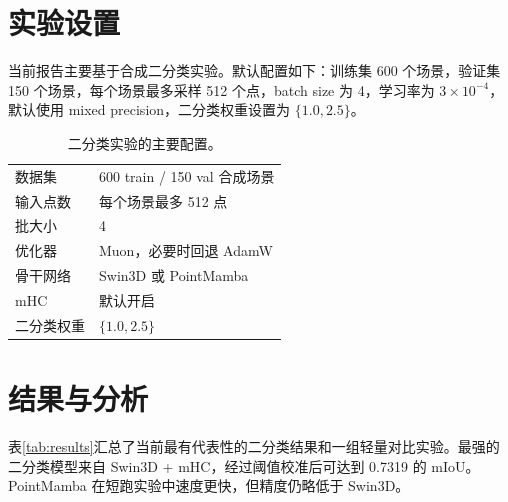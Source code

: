 \documentclass[conference]{IEEEtran}
\begin{document}
\section{实验设置}
当前报告主要基于合成二分类实验。默认配置如下：训练集 600 个场景，验证集 150 个场景，每个场景最多采样 512 个点，batch size 为 4，学习率为 $3\times 10^{-4}$，默认使用 mixed precision，二分类权重设置为 $\{1.0, 2.5\}$。

\begin{table}[t]
\centering
\caption{二分类实验的主要配置。}
\label{tab:setup}
\small
\begin{tabular}{p{}p{}}
\toprule
数据集 & 600 train / 150 val 合成场景 \\
输入点数 & 每个场景最多 512 点 \\
批大小 & 4 \\
优化器 & Muon，必要时回退 AdamW \\
骨干网络 & Swin3D 或 PointMamba \\
mHC & 默认开启 \\
二分类权重 & $\{1.0, 2.5\}$ \\
\bottomrule
\end{tabular}
\end{table}

\section{结果与分析}
表\ref{tab:results}汇总了当前最有代表性的二分类结果和一组轻量对比实验。最强的二分类模型来自 Swin3D + mHC，经过阈值校准后可达到 0.7319 的 mIoU。PointMamba 在短跑实验中速度更快，但精度仍略低于 Swin3D。

\begin{table}[t]
\centering
\caption{合成验证集上的代表性结果与轻量对比。}
\label{tab:results}
\small
\setlength{\tabcolsep}{4pt}
\end{table}
\end{document}
